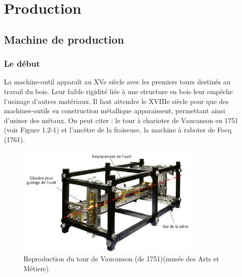 \documentclass[
	11pt, %
	fleqn, %
	a4paper, %
]{LegrandOrangeBook}
\begin{document}


\part{Production}


\chapter{Machine de production}

\section{Le début}

La machine-outil apparaît au XVe siècle avec les premiers tours destinés au travail du bois.
Leur faible rigidité liée à une structure en bois leur empêche l’usinage d’autres matériaux. Il
faut attendre le XVIIIe siècle pour que des machines-outils en construction métallique apparaissent,
permettant ainsi d’usiner des métaux. On peut citer : le tour à charioter de Vaucanson
en 1751 (voir Figure 1.2-1) et l’ancêtre de la fraiseuse, la machine à raboter de Focq (1761).

\begin{figure}[H] %
	\centering %
	\includegraphics[width=0.8\textwidth]{Images/A01.PNG} %
	\caption{Reproduction du tour de Vaucanson (de 1751)(musée des Arts et Métiers).}
	\label{fig:placeholder} %
\end{figure}
\end{document}
